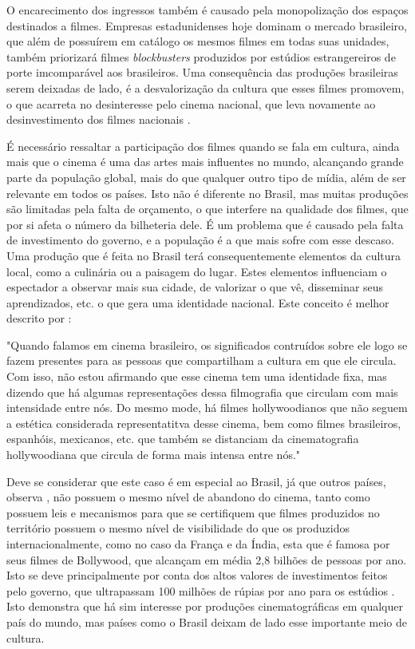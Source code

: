 \documentclass[
	article,			%
	12pt,				%
	oneside,			%
	a4paper,			%
	english,			%
	brazil,				%
	sumario=tradicional
	]{abntex2}
\begin{document}
O encarecimento dos ingressos também é causado pela monopolização dos espaços destinados a filmes. Empresas estadunidenses hoje dominam o mercado brasileiro, que além de possuírem em catálogo os mesmos filmes em todas suas unidades, também priorizará filmes \textit{blockbusters} produzidos por estúdios estrangereiros de porte imcomparável aos brasileiros. Uma consequência das produções brasileiras serem deixadas de lado, é a desvalorização da cultura que esses filmes promovem, o que acarreta no desinteresse pelo cinema nacional, que leva novamente ao desinvestimento dos filmes nacionais \cite{BOTELHO}.

É necessário ressaltar a participação dos filmes quando se fala em cultura, ainda mais que o cinema é uma das artes mais influentes no mundo, alcançando grande parte da população global, mais do que qualquer outro tipo de mídia, além de ser relevante em todos os países. Isto não é diferente no Brasil, mas muitas produções são limitadas pela falta de orçamento, o que interfere na qualidade dos filmes, que por si afeta o número da bilheteria dele. É um problema que é causado pela falta de investimento do governo, e a população é a que mais sofre com esse descaso. Uma produção que é feita no Brasil terá consequentemente elementos da cultura local, como a culinária ou a paisagem do lugar. Estes elementos influenciam o espectador a observar mais sua cidade, de valorizar o que vê, disseminar seus aprendizados, etc. o que gera uma identidade nacional. Este conceito é melhor descrito por :

	\begin{citacao}
		"Quando falamos em cinema brasileiro, os significados contruídos sobre ele logo se fazem presentes para as pessoas que compartilham a cultura em que ele circula. Com isso, não estou afirmando que esse cinema tem uma identidade fixa, mas dizendo que há algumas representações dessa filmografia que circulam com mais intensidade entre nós. Do mesmo mode, há filmes hollywoodianos que não seguem a estética considerada representatitva desse cinema, bem como filmes brasileiros, espanhóis, mexicanos, etc. que também se distanciam da cinematografia hollywoodiana que circula de forma mais intensa entre nós." 
        \cite{HENN}
	\end{citacao}

Deve se considerar que este caso é em especial ao Brasil, já que outros países, observa , não possuem o mesmo nível de abandono do cinema, tanto como possuem leis e mecanismos para que se certifiquem que filmes produzidos no território possuem o mesmo nível de visibilidade do que os produzidos internacionalmente, como no caso da França e da Índia, esta que é famosa por seus filmes de Bollywood, que alcançam em média 2,8 bilhões de pessoas por ano. Isto se deve principalmente por conta dos altos valores de investimentos feitos pelo governo, que ultrapassam 100 milhões de rúpias por ano para os estúdios \cite{LUCIANA}. Isto demonstra que há sim interesse por produções cinematográficas em qualquer país do mundo, mas países como o Brasil deixam de lado esse importante meio de cultura.
\end{document}
